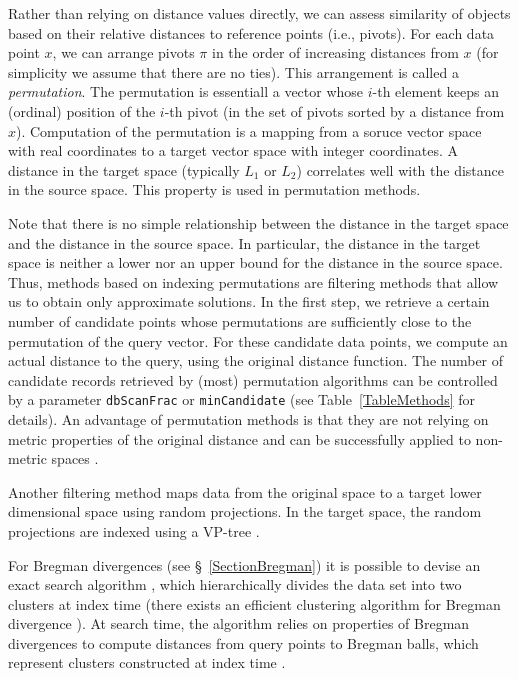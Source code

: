 \documentclass[runningheads,a4paper]{llncs}
\newcommand{\ttt}[1]{\texttt{#1}}
\begin{document}
Rather than relying on distance values directly,
we can assess similarity of objects based on their
relative distances to reference points (i.e., pivots).
For each data point $x$,
we can arrange pivots $\pi$ in the order of increasing distances from $x$ (for
simplicity we assume that there are no ties).
This arrangement is called a \emph{permutation}.
The permutation is essentiall a vector whose \mbox{$i$-th}
element keeps an (ordinal) position of the \mbox{$i$-th} pivot (in the set of pivots
sorted by a distance from $x$).
Computation of the permutation
is a mapping from a soruce vector space with real coordinates to a target vector space with integer coordinates. 
A distance in the target space (typically $L_1$ or $L_2$) correlates well with the distance in the source space.
This property is used in permutation methods.

Note that there is no simple relationship between the distance in the target space
and the distance in the source space. In particular, the distance in the target space is neither a lower nor an upper bound
for the distance in the source space.
Thus, methods based on indexing permutations are filtering methods that allow us to obtain only approximate solutions.
In the first step, we retrieve a certain number of candidate points whose permutations are sufficiently close
to the permutation of the query vector.
For these candidate data points, we compute an actual distance to the query, using the original distance function.
The number of candidate records retrieved by (most) permutation algorithms can be controlled by a parameter \ttt{dbScanFrac} or \ttt{minCandidate} (see Table~\ref{TableMethods} for details).
An advantage of permutation methods is that they are not relying on metric properties of the original distance 
and can be successfully applied to non-metric spaces \cite{Boytsov_and_Bilegsaikhan:nips2013}.

Another filtering method maps data from the original space to a target lower dimensional space
using random projections. In the target space, the random projections are indexed using
a VP-tree \cite{Uhlmann:1991,Yianilos:1993}.

For Bregman divergences (see \S~\ref{SectionBregman}) it is possible to devise
an exact search algorithm \cite{Cayton:2008},
which hierarchically divides the data set into two clusters  
at index time (there exists an efficient clustering algorithm for Bregman divergence \cite{banerjee2005clustering}).
At search time,
the algorithm relies on properties of Bregman divergences to compute distances from query points to Bregman balls,
which represent clusters constructed at index time \cite{Cayton:2008}.
\end{document}
